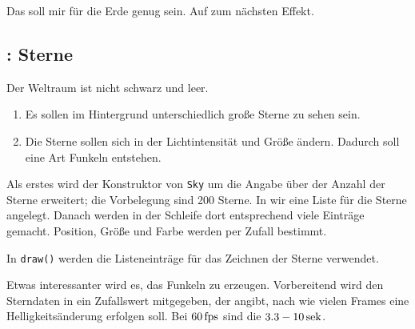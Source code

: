 
Das soll mir für die Erde genug sein. Auf zum nächsten Effekt.


\subsection{: Sterne}

Der Weltraum ist nicht schwarz und leer. 

\begin{enumerate}
	\item Es sollen im Hintergrund unterschiedlich große Sterne zu sehen sein.\label{reqStarsAnzeigen}
	\item Die Sterne sollen sich in der Lichtintensität und Größe ändern. Dadurch soll eine Art Funkeln entstehen.\label{reqStarsFunkeln}
\end{enumerate}
\er


Als erstes wird der Konstruktor von \texttt{Sky} um die Angabe über der Anzahl der Sterne erweitert; die Vorbelegung sind 200 Sterne. In  wir eine Liste für die Sterne angelegt. Danach werden in der Schleife dort entsprechend viele Einträge gemacht. Position, Größe und Farbe werden per Zufall bestimmt.


In \texttt{draw()} werden die Listeneinträge für das Zeichnen der Sterne verwendet.



Etwas interessanter wird es, das Funkeln zu erzeugen. Vorbereitend wird den Sterndaten in  ein Zufallswert mitgegeben, der angibt, nach wie vielen Frames eine Helligkeitsänderung erfolgen soll. Bei $\unit[60]{fps}$ sind die $3.3 - \unit[10]{sek}$.


